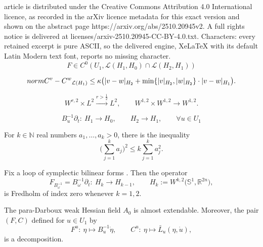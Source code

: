 \documentclass[10pt,a4paper]{amsart}
\def\abs#1{\mathopen|#1\mathclose|}
\newcommand{\Ll}{{\mathcal{L}}} %
\newcommand{\N}{{\mathbb{N}}}
\newcommand{\R}{{\mathbb{R}}}
\newcommand{\norm}{{\rm norm}}
\newcommand{\p}{{\partial}}
\renewcommand{\SS}{{\mathbb{S}}}
\begin{document}
article is distributed under the Creative Commons Attribution 4.0 International licence, as recorded in the arXiv licence metadata for this exact version and shown on the abstract page https://arxiv.org/abs/2510.20945v2. A full rights notice is delivered at licenses/arxiv-2510.20945-CC-BY-4.0.txt. Characters: every retained excerpt is pure ASCII, so the delivered engine, XeLaTeX with its default Latin Modern text font, reports no missing character.
\begin{equation}\label{eq:hyp-F}
 F\in C^0(U_1,\Ll(H_1,H_0)\cap\Ll(H_2,H_1))
\end{equation}

 \begin{equation}\itemsep=0pt\label{eq:(C)}
 \norm{C^v-C^w}_{\Ll(H_1)}
 \le\kappa\bigl(\abs{v-w}_{H_2}
 +\min\{\abs{v}_{H_2},\abs{w}_{H_2}\}\cdot\abs{v-w}_{H_1}\bigr).
 \end{equation}

\begin{equation}\label{eq:Behz-Hol-2}
 W^{r,2}\times L^2\stackrel{r>\frac12}{\longrightarrow} L^2
 ,\qquad
 W^{1,2}\times W^{1,2}\to W^{1,2}
 .
\end{equation}

\begin{equation}\label{eq:hjghjghj77799}
 B_u^{-1}\p_t\colon\ H_1\to H_0,\qquad H_2\to H_1
 ,\qquad \forall u\in U_1
\end{equation}

\begin{Lemma}\label{le:sum-quad}
For $k\in\N$ real numbers $a_1,\dots,a_k>0$, there is the inequality
\[
 \Biggl(\sum_{j=1}^k a_j\Biggr)^2
 \le k\sum_{j=1}^k a_j^2 .
\]
\end{Lemma}

\begin{Theorem}\label{thm:Fredholm-F_C}
Fix a loop of symplectic bilinear forms
\smash{$\omega\in W^{1,2}\bigl(\SS^1,\Omega\bigl(\R^{2n}\bigr)\bigr)$}.
Then the operator
\[
 F_{B_\omega^{-1}}=B_\omega^{-1}\p_t
 \colon\ H_{k}\to H_{k-1}
 ,\qquad
 H_k:=W^{k,2}\bigl(\SS^1,\R^{2n}\bigr) ,
\]
is Fredholm of index zero
whenever $k=1,2$.
\end{Theorem}

\begin{Theorem}\label{thm:paradarboux-Hess}
The para-Darboux weak Hessian field $A_0$ is almost extendable.
Moreover, the pair $(F,C)$ defined for $u\in U_1$ by
\[
 F^u\colon\ \eta\mapsto B_u^{-1}\dot \eta
 ,\qquad
 C^u\colon\ \eta\mapsto \bar L_u(\eta,\dot u) ,
\]
is a decomposition.
\end{Theorem}
\end{document}
